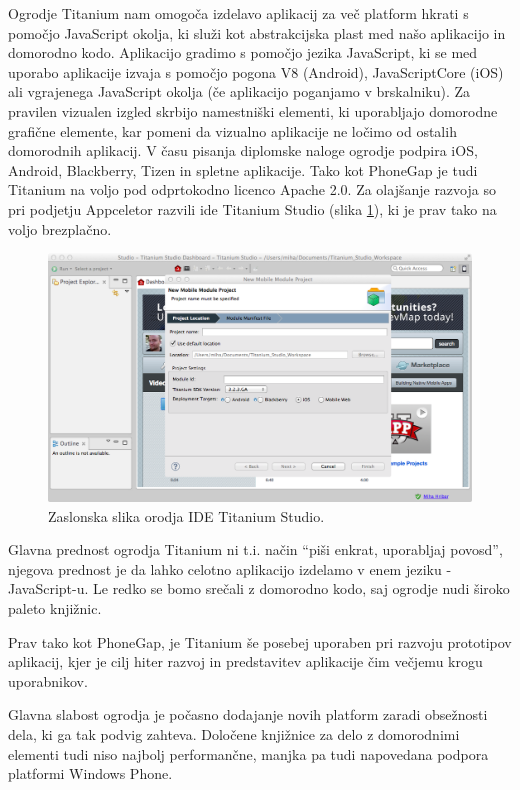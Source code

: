 Ogrodje Titanium\cite{titanium} nam omogoča izdelavo aplikacij za več platform hkrati s pomočjo JavaScript okolja, ki služi kot abstrakcijska plast med našo aplikacijo in domorodno kodo. Aplikacijo gradimo s pomočjo jezika JavaScript, ki se med uporabo aplikacije izvaja s pomočjo pogona V8\cite{v8} (Android), JavaScriptCore (iOS)\cite{javascriptcore} ali vgrajenega JavaScript okolja (če aplikacijo poganjamo v brskalniku). Za pravilen vizualen izgled skrbijo namestniški elementi, ki uporabljajo domorodne grafične elemente, kar pomeni da vizualno aplikacije ne ločimo od ostalih domorodnih aplikacij. V času pisanja diplomske naloge ogrodje podpira iOS, Android, Blackberry, Tizen in spletne aplikacije. Tako kot PhoneGap je tudi Titanium na voljo pod odprtokodno licenco Apache 2.0. Za olajšanje razvoja so pri podjetju Appceletor razvili \gls{ide} Titanium Studio (slika \ref{fig:titanium-studio}), ki je prav tako na voljo brezplačno.

\begin{figure}
 \includegraphics[width=\linewidth]{titanium}
 \caption{Zaslonska slika orodja IDE Titanium Studio.}
 \label{fig:titanium-studio}
\end{figure}

Glavna prednost ogrodja Titanium ni t.i. način ``piši enkrat, uporabljaj povosd'', njegova prednost je da lahko celotno aplikacijo izdelamo v enem jeziku - JavaScript-u. Le redko se bomo srečali z domorodno kodo, saj ogrodje nudi široko paleto knjižnic.

Prav tako kot PhoneGap, je Titanium še posebej uporaben pri razvoju prototipov aplikacij, kjer je cilj hiter razvoj in predstavitev aplikacije čim večjemu krogu uporabnikov.

Glavna slabost ogrodja je počasno dodajanje novih platform zaradi obsežnosti dela, ki ga tak podvig zahteva. Določene knjižnice za delo z domorodnimi elementi tudi niso najbolj performančne, manjka pa tudi napovedana podpora platformi Windows Phone.

